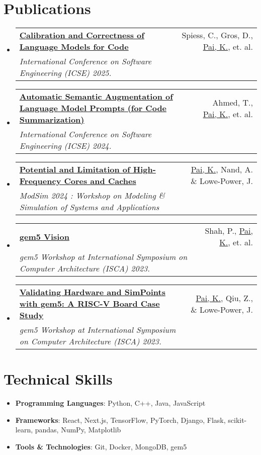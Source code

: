 \documentclass[letterpaper,10pt]{article}
\makeatletter
\newcommand{\resumeItem}[1]{\item\small{#1} \vspace{-3pt}}
\newcommand{\resumeSubheading}[4]{
\vspace{-1pt}\item
  \begin{tabular*}{0.97\textwidth}[t]{l@{\extracolsep{\fill}}r}
    \textbf{#1} & #2 \\
    \textit{#3} & \textit{#4} \\
  \end{tabular*}\vspace{-7pt}
}
\newcommand{\resumeSubHeadingList}{\begin{itemize}[leftmargin=0.15in, label={}]}
\newcommand{\resumeSubHeadingListEnd}{\end{itemize}}
\makeatother
\begin{document}
\section{Publications} %
\resumeSubHeadingList
  \resumeSubheading
      {\href{https://arxiv.org/pdf/2402.02047}{Calibration and Correctness of Language Models for Code}}{Spiess, C., Gros, D., \underline{Pai, K.}, et. al.}
      {International Conference on Software Engineering (ICSE) 2025.}{}
  \resumeSubheading
      {\href{https://dl.acm.org/doi/pdf/10.1145/3597503.3639183}{Automatic Semantic Augmentation of Language Model Prompts (for Code Summarization)}}{Ahmed, T., \underline{Pai, K.}, et. al.}
      {International Conference on Software Engineering (ICSE) 2024.}{}
  \resumeSubheading
      {\href{https://arch.cs.ucdavis.edu/simulation/2024/08/06/potentiallimitationhighfreqcorescaches.html}{Potential and Limitation of High-Frequency Cores and Caches}}{\underline{Pai, K.}, Nand, A. \& Lowe-Power, J.}
      {ModSim 2024 : Workshop on Modeling \& Simulation of Systems and Applications}{}
  \resumeSubheading
      {\href{https://www.gem5.org/assets/files/workshop-isca-2023/posters/gem5-vision-poster.pdf}{gem5 Vision}}{Shah, P., \underline{Pai, K.}, et. al.}
      {gem5 Workshop at International Symposium on Computer Architecture (ISCA) 2023.}{}
  \resumeSubheading
      {\href{https://www.gem5.org/assets/files/workshop-isca-2023/posters/validating-hardware-and-simpoints-with-gem5-poster.pdf}{Validating Hardware and SimPoints with gem5: A RISC-V Board Case Study}}{\underline{Pai, K.}, Qiu, Z., \& Lowe-Power, J.}
      {gem5 Workshop at International Symposium on Computer Architecture (ISCA) 2023.}{}
\resumeSubHeadingListEnd

\section{Technical Skills}
\resumeSubHeadingList
    \resumeItem{\textbf{Programming Languages}: Python, C++, Java, JavaScript}
    \resumeItem{\textbf{Frameworks}: React, Next.js, TensorFlow, PyTorch, Django, Flask, scikit-learn, pandas, NumPy, Matplotlib}
    \resumeItem{\textbf{Tools \& Technologies}: Git, Docker, MongoDB, gem5}
\resumeSubHeadingListEnd

\end{document}
